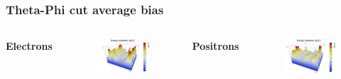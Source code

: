 \documentclass{beamer}
\begin{document}
		\begin{frame}
			\frametitle{Theta-Phi cut average bias}
			\begin{columns}
				\centering
				\Large \textbf{Electrons}
				\begin{figure}
					\centering
					\includegraphics[width = 0.95 \linewidth]{../images/c_e_theta_phi.png}
				\end{figure}
				\centering
				\Large \textbf{Positrons}
				\begin{figure}
					\centering
					\includegraphics[width = 0.95 \linewidth]{../images/c_p_theta_phi.png}
				\end{figure}
			\end{columns}
		\end{frame}
\end{document}
